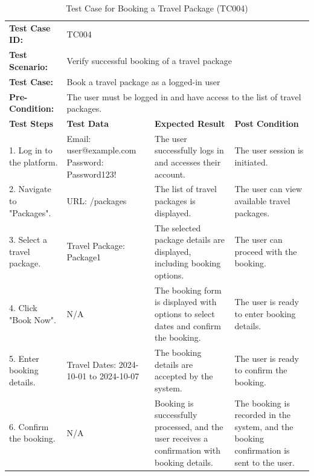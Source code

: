 \documentclass{scrreprt}
\begin{document}
\begin{longtable}{| m{2cm} | m{5cm} | m{4cm} | m{3cm} |}
\caption{Test Case for Booking a Travel Package (TC004)}
\vspace{0.5cm} \\ \hline
\textbf{Test Case ID:} & \multicolumn{3}{l|}{TC004} \\ \hline
\textbf{Test Scenario:} & \multicolumn{3}{l|}{Verify successful booking of a travel package} \\ \hline
\textbf{Test Case:} & \multicolumn{3}{l|}{Book a travel package as a logged-in user} \\ \hline
\textbf{Pre-Condition:} & \multicolumn{3}{l|}{The user must be logged in and have access to the list of travel packages.} \\ \hline
\textbf{Test Steps} & \textbf{Test Data} & \textbf{Expected Result} & \textbf{Post Condition} \\ \hline
1. Log in to the platform. & Email: user@example.com \newline Password: Password123! & The user successfully logs in and accesses their account. & The user session is initiated. \\ \hline
2. Navigate to "Packages". & URL: /packages & The list of travel packages is displayed. & The user can view available travel packages. \\ \hline
3. Select a travel package. & Travel Package: Package1 & The selected package details are displayed, including booking options. & The user can proceed with the booking. \\ \hline
4. Click "Book Now". & N/A & The booking form is displayed with options to select dates and confirm the booking. & The user is ready to enter booking details. \\ \hline
5. Enter booking details. & Travel Dates: 2024-10-01 to 2024-10-07 & The booking details are accepted by the system. & The user is ready to confirm the booking. \\ \hline
6. Confirm the booking. & N/A & Booking is successfully processed, and the user receives a confirmation with booking details. & The booking is recorded in the system, and the booking confirmation is sent to the user. \\ \hline
\end{longtable}

\vspace{1cm}
\end{document}
